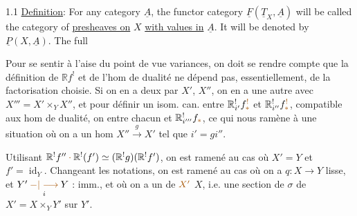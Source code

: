 1.1 \uline{Definition}: For any category $\underline A$, the functor category $\underline F(\underline T_X,\underline A)$ will be called the category of \uline{presheaves on} $X$ \uline{with values in} $\underline A$. It will be denoted by $\underline P(X,\underline A)$. The full

Pour se sentir à l'aise du point de vue  variances, on doit se rendre compte que la définition de $\mathbb{R}f^!$ et de l'hom de dualité ne dépend pas, essentiellement, de la factorisation choisie.
Si on en a deux par $X'$, $X''$, on en a une autre avec $X'''=X'\times_Y X''$, et pour définir un isom. can. entre $\mathbb{R}^!_{i'}f^{\deleted{\unsure{!}}}_{\deleted{\unsure{*}}}$ et $\mathbb{R}^!_{i''}f^{\deleted{\unsure{!}}}_{\deleted{\unsure{*}}}$, compatible aux hom de dualité, on \uline{} entre   chacun et $\mathbb{R}^!_{i'''}f_{\unsure{*}}$, ce qui nous ramène à une situation où on a un hom  $X''\xrightarrow{g}X'$ tel que $i'=gi''$.



Utilisant $\mathbb{R}^!f''\mathbin{\unsure{\cdot}}\mathbb{R}^!(f')\simeq(\mathbb{R}^!g)(\mathbb{R}^!f')$, on est ramené au cas où $X'=Y$ et $f'=\operatorname{id}_Y$.
Changeant les notations, on est ramené au cas où on a $q:X\longrightarrow Y$ lisse, et $Y'\mathbin{\underset{i}{\unsure{-|\longrightarrow}}}Y$ : imm., et où on a un   de $\unsure{X'}$  $X$, i.e. une section de $\sigma$ de $X'=X\times_Y Y'$ sur $Y'$.


